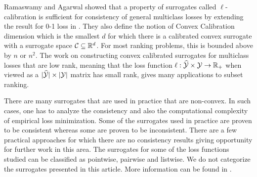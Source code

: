 Ramaswamy and Agarwal \cite{ramaswamy2016convex} showed that a property of surrogates called $\ell$-calibration is sufficient for consistency of general multiclass losses by extending the result for 0-1 loss in \cite{tewari2007consistency}. They also define the notion of Convex Calibration dimension which is the smallest $d$ for which there is a calibrated convex surrogate with a surrogate space ${\mathcal C} \subseteq {\mathbb R}^d$. For most ranking problems, this is bounded above by $n$ or $n^2$.  The work \cite{ramaswamy2013convex} on constructing convex calibrated surrogates for multiclass losses that are low rank, meaning that the loss function $\ell:\widehat{\mathcal{Y}} \times {\mathcal Y} \to {\mathbb R}_+$ when viewed as a $|\widehat{\mathcal{Y}}|\times|{\mathcal Y}|$ matrix has small rank, gives many applications to subset ranking. 

There are many surrogates that are used in practice that are non-convex.
In such cases, one has to analyze the consistency and also the computational
complexity of empirical loss minimization. Some of the surrogates used in
practice are proven to be consistent whereas some are proven to be
inconsistent. There are a few practical approaches for which there are no
consistency results giving opportunity for further work in this area.
The surrogates for some of the loss functions studied can be classified as
pointwise, pairwise and listwise. We do not categorize the surrogates
presented in this article. More information can be found in \cite{li2011short}.

